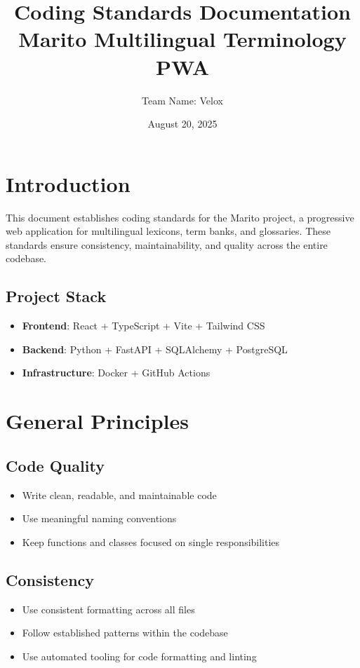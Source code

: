 \documentclass[12pt]{article}
\title{Coding Standards Documentation\\\large\textbf{Marito Multilingual Terminology PWA}}
\author{Team Name: Velox}
\date{August 20, 2025}
\begin{document}
\maketitle
\tableofcontents
\newpage

\section{Introduction}
This document establishes coding standards for the Marito project, a progressive web application for multilingual lexicons, term banks, and glossaries. These standards ensure consistency, maintainability, and quality across the entire codebase.

\subsection{Project Stack}
\begin{itemize}
    \item \textbf{Frontend}: React + TypeScript + Vite + Tailwind CSS
    \item \textbf{Backend}: Python + FastAPI + SQLAlchemy + PostgreSQL
    \item \textbf{Infrastructure}: Docker + GitHub Actions
\end{itemize}

\section{General Principles}

\subsection{Code Quality}
\begin{itemize}
    \item Write clean, readable, and maintainable code
    \item Use meaningful naming conventions
    \item Keep functions and classes focused on single responsibilities
\end{itemize}

\subsection{Consistency}
\begin{itemize}
    \item Use consistent formatting across all files
    \item Follow established patterns within the codebase
    \item Use automated tooling for code formatting and linting
\end{itemize}
\end{document}
